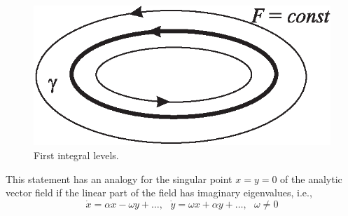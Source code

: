 \begin{figure}[!ht]
		\centering
		\includegraphics [scale=1.1]{jtr24}
		\caption{First integral levels.}
		\label{fig:2.4}
\end{figure}

This statement has an analogy for the singular point $ x = y = 0 $ of the analytic vector field if the linear part of the field has imaginary eigenvalues, i.e., \begin{equation}
\label{2.3}
\dot{x}=\alpha x-\omega y+\ldots ,\text{ \ \ }\dot{y}=\omega x+\alpha
y+\ldots ,\text{ \ }\omega \not=0
\end{equation}

